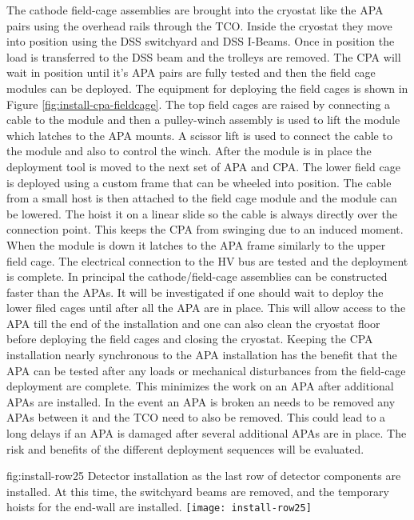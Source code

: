 The cathode field-cage assemblies are brought into the cryostat like the APA pairs using the overhead rails through the TCO. Inside the cryostat they move into position using the DSS switchyard and DSS I-Beams. Once in position the load is transferred to the DSS beam and the trolleys are removed. The CPA will wait in position until it's APA pairs are fully tested and then the field cage modules can be deployed. The equipment for deploying the field cages is shown in Figure \ref{fig:install-cpa-fieldcage}. The top field cages are raised by connecting a cable to the module and then a pulley-winch assembly is used to lift the module which latches to the APA mounts. A scissor lift is used to connect the cable to the module and also to control the winch. After the module is in place the deployment tool is moved to the next set of APA and CPA. The lower field cage is deployed using a custom frame that can be wheeled into position. The cable from a small host  is then attached to the field cage module and the module can be lowered. The hoist it on a linear slide so the cable is always directly over the connection point. This keeps the CPA from swinging due to an induced moment. When the module is down it latches to the APA frame similarly to the upper field cage. The electrical connection to the HV bus are tested and the deployment is complete. In principal the cathode/field-cage assemblies can be constructed faster than the APAs. It will be investigated if one should
wait to deploy the lower filed cages until after all the APA are in place. This will allow access to the APA till the end of the installation and one can also clean the cryostat floor before deploying the field cages and closing the cryostat.
Keeping the CPA installation nearly synchronous to the APA installation has the benefit that the APA can be tested after any loads or mechanical disturbances from the field-cage deployment are complete. This minimizes the work on an APA after additional APAs are installed. In the event an APA is broken an needs to be removed any APAs between it and the TCO need to also be removed. This could lead to a long delays if an APA is damaged after several additional APAs are in place. The risk and benefits of the different deployment sequences will be evaluated.

\begin{dunefigure}{fig:install-row25}
  {Detector installation as the last row of detector components are installed. At this time, the switchyard beams are removed, and the temporary hoists for the end-wall are installed.}
\texttt{[image: install-row25]}
\end{dunefigure}


